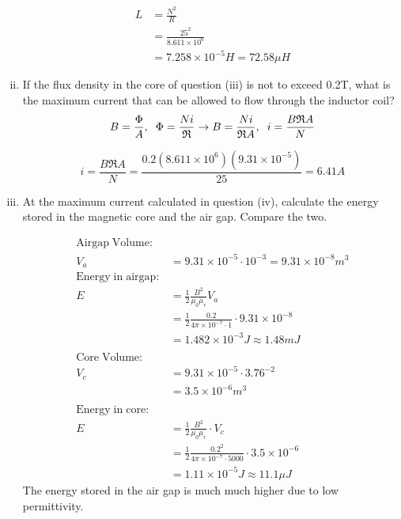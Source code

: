 \documentclass[a4paper,11pt]{article}
\begin{document}
\begin{enumerate}[i.]
          \begin{align*}
              L & = \frac{N^2}{R}                     \\
                & =\frac{25^2}{8.611\times 10^6}      \\
                & = 7.258\times 10^{-5}H = 72.58\mu H
          \end{align*}

    \item If the flux density in the core of question (iii) is not to exceed 0.2T, what is the maximum current that can be allowed to flow through the inductor coil?
          $$B = \frac{\Phi}{A}, \hspace{2mm} \Phi = \frac{Ni}{\mathfrak{R}} \rightarrow B = \frac{Ni}{\mathfrak{R}A}, \hspace{2mm}i = \frac{B\mathfrak{R}A}{N}$$

          $$i = \frac{B\mathfrak{R}A}{N} = \frac{0.2(8.611\times10^6)(9.31\times 10^{-5})}{25} = 6.41A$$

          \newpage
    \item At the maximum current calculated in question (iv), calculate the energy stored in the magnetic core and the air gap. Compare the two.

        \begin{align*}
            \mathrm{Airgap\;Volume:}\\
            V_{a} &= 9.31\times10^{-5}\cdot 10^{-3} = 9.31\times10^{-8}m^3 \\
            \mathrm{Energy\;in\;airgap:}\\
            E & = \frac{1}{2}\frac{B^2}{\mu_0 \mu_r}V_{a}                                    \\
              & = \frac{1}{2}\frac{0.2}{4\pi\times10^{-7}\cdot 1}\cdot 9.31\times10^{-8} \\
              & = 1.482\times 10^{-3}J \approx 1.48m J \\\\
            \mathrm{Core\;Volume:}\\
            V_{c} & = 9.31\times10^{-5}\cdot 3.76^{-2} \\
            & = 3.5\times10^{-6}m^3 \\\\
            \mathrm{Energy\;in\;core:}\\
                E & = \frac{1}{2}\frac{B^2}{\mu_0 \mu_r}\cdot V_{c}                                  \\
                & = \frac{1}{2}\frac{0.2^2}{4\pi\times10^{-7}\cdot 5000}\cdot 3.5\times10^{-6} \\
                & = 1.11\times 10^{-5}J \approx 11.1\mu J
        \end{align*}
        The energy stored in the air gap is much much higher due to low permittivity.
\end{enumerate}
\end{document}
